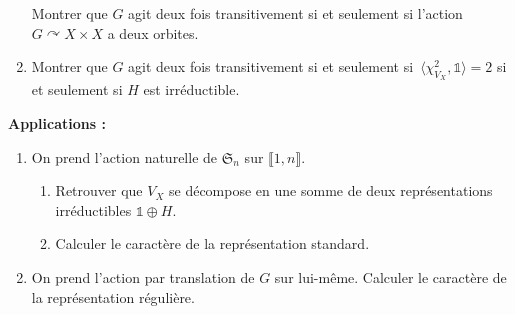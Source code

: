 \documentclass[./main]{subfiles}
\begin{document}
\begin{enonce}
\begin{enumerate}[resume*]
        Montrer que $G$ agit deux fois transitivement si et seulement si l'action $G \curvearrowright X \times X$ a deux orbites.
      \item Montrer que $G$ agit deux fois transitivement si et seulement si~$\langle \chi_{V_X}^2, \mathds{1} \rangle = 2$ si et seulement si $H$ est irréductible.
    \end{enumerate}
    \textbf{Applications :}
    \begin{enumerate}[resume*]
      \item On prend l'action naturelle de $\mathfrak{S}_n$ sur $\llbracket 1,n\rrbracket$.
        \begin{enumerate}
          \item Retrouver que $V_X$ se décompose en une somme de deux représentations irréductibles $\mathds{1} \oplus H$.
          \item Calculer le caractère de la représentation standard.
        \end{enumerate}
        \item On prend l'action par translation de $G$ sur lui-même. Calculer le caractère de la représentation régulière.
    \end{enumerate}
  \end{enonce}
\end{document}
